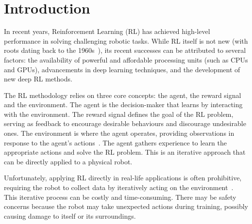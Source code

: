 \section{Introduction}
\label{sec:intro}

In recent years, Reinforcement Learning (RL) has achieved high-level performance in solving challenging robotic tasks. %
While RL itself is not new (with roots dating back to the 1960s~\cite{minsky1961steps}), its recent successes can be attributed to several factors: the availability of powerful and affordable processing units (such as CPUs and GPUs), advancements in deep learning techniques, and the development of new deep RL methods.

The RL methodology relies on three core concepts: the agent, the reward signal and the environment. The agent is the decision-maker that learns by interacting with the environment. The reward signal defines the goal of the RL problem, serving as feedback to encourage desirable behaviours and discourage undesirable ones. The environment is where the agent operates, providing observations in response to the agent's actions~\cite{sutton2018reinforcement}. The agent gathers experience to learn the appropriate actions and solve the RL problem. This is an iterative approach that can be directly applied to a physical robot. %



Unfortunately, applying RL directly in real-life applications is often prohibitive, requiring the robot to collect data by iteratively acting on the environment~\cite{levine2020offline}. This iterative process can be costly and time-consuming. There may be safety concerns because the robot may take unexpected actions during training, possibly causing damage to itself or its surroundings.

